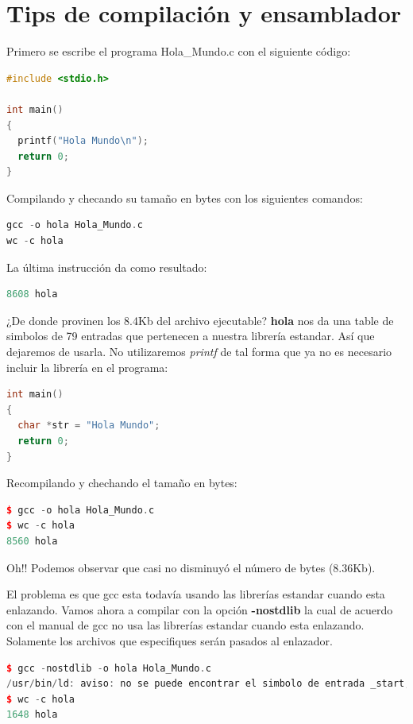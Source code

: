 \documentclass[12pt, twoside]{report}
\begin{document}
\section{Tips de compilación y ensamblador}
Primero se escribe el programa Hola\_Mundo.c con el siguiente código:

\begin{lstlisting}[language=C++]
#include <stdio.h>

int main()
{
  printf("Hola Mundo\n");
  return 0;
}
\end{lstlisting}

Compilando y checando su tamaño en bytes con los siguientes comandos:

\begin{lstlisting}[language=C++]
gcc -o hola Hola_Mundo.c
wc -c hola
\end{lstlisting}

La última instrucción da como resultado:

\begin{lstlisting}[language=C++]
8608 hola
\end{lstlisting}
 ¿De donde provinen los 8.4Kb del archivo ejecutable? \textbf{hola}  nos da una table de simbolos de 79 entradas que pertenecen a nuestra librería estandar. Así que dejaremos de usarla. No utilizaremos \emph{printf} de tal forma que ya no es necesario incluir la librería en el programa:
 
 \begin{lstlisting}[language=C++]
int main()
{
  char *str = "Hola Mundo";
  return 0;
}
\end{lstlisting} 
 
 Recompilando y chechando el tamaño en bytes:

\begin{lstlisting}[language=C++]
$ gcc -o hola Hola_Mundo.c
$ wc -c hola
8560 hola
\end{lstlisting}

Oh!! Podemos observar que casi no disminuyó el número de bytes (8.36Kb). 

El problema es que gcc esta todavía usando las librerías estandar cuando esta enlazando. Vamos ahora a compilar con la opción \textbf{-nostdlib} la cual de acuerdo con el manual de gcc no usa las librerías estandar cuando esta enlazando. Solamente los archivos que especifiques serán pasados al enlazador.

\begin{lstlisting}[language=C++]
$ gcc -nostdlib -o hola Hola_Mundo.c
/usr/bin/ld: aviso: no se puede encontrar el simbolo de entrada _start; se usa por defecto 0000000000400144
$ wc -c hola
1648 hola
\end{lstlisting}
\end{document}

